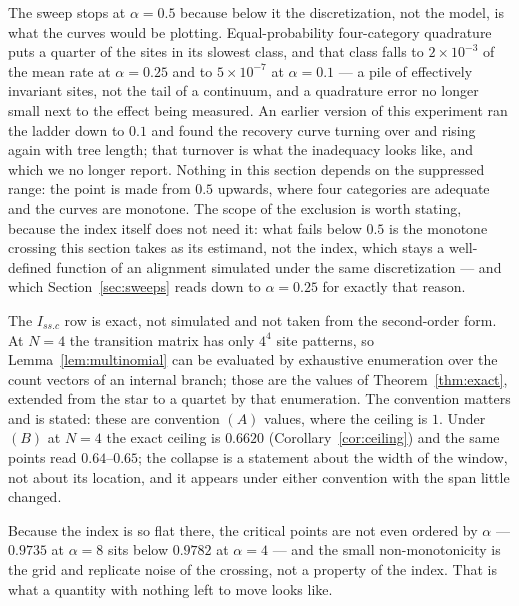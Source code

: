 \documentclass[preprint,12pt,authoryear]{elsarticle}
\newcommand{\Issc}{I_{ss.c}}
\theoremstyle{definition}
\theoremstyle{remark}
\begin{document}
\begin{sloppypar}
The sweep stops at $\alpha=0.5$ because below it the discretization, not the
model, is what the curves would be plotting. Equal-probability four-category
quadrature puts a quarter of the sites in its slowest class, and that class
falls to $2\times10^{-3}$ of the mean rate at $\alpha=0.25$ and to
$5\times10^{-7}$ at $\alpha=0.1$ --- a pile of effectively invariant sites,
not the tail of a continuum, and a quadrature error no longer small next to
the effect being measured. An earlier version of this experiment ran the
ladder down to $0.1$ and found the recovery curve turning over and rising
again with tree length; that turnover is what the inadequacy looks like, and
which we no longer report. Nothing in this section depends on the suppressed
range: the point is made from $0.5$ upwards, where four categories are
adequate and the curves are monotone. The scope of the exclusion is worth
stating, because the index itself does not need it: what fails below $0.5$ is
the monotone crossing this section takes as its estimand, not the index, which
stays a well-defined function of an alignment simulated under the same
discretization --- and which Section~\ref{sec:sweeps} reads down to
$\alpha=0.25$ for exactly that reason.

The $\Issc$ row is exact, not simulated and not taken from the second-order
form. At $N=4$ the transition matrix has only $4^4$ site patterns, so
Lemma~\ref{lem:multinomial} can be evaluated by exhaustive enumeration over
the count vectors of an internal branch; those are the values of
Theorem~\ref{thm:exact}, extended from the star to a quartet by that
enumeration. The convention matters and is stated: these are convention $(A)$
values, where the ceiling is $1$. Under $(B)$ at $N=4$ the exact ceiling is
$0.6620$ (Corollary~\ref{cor:ceiling}) and the same points read
$0.64$--$0.65$; the collapse is a statement about the width of the window,
not about its location, and it appears under either convention with the span
little changed.

Because the index is so flat there, the critical points are not even ordered
by $\alpha$ --- $0.9735$ at $\alpha=8$ sits below $0.9782$ at $\alpha=4$ ---
and the small non-monotonicity is the grid and replicate noise of the
crossing, not a property of the index. That is what a quantity with nothing
left to move looks like.


\end{sloppypar}
\end{document}
